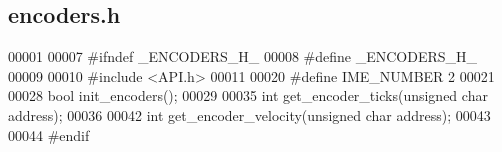 \subsection{encoders.\+h}
\label{encoders_8h_source}

\begin{DoxyCode}
00001 
00007 \textcolor{preprocessor}{#ifndef \_ENCODERS\_H\_}
00008 \textcolor{preprocessor}{#define \_ENCODERS\_H\_}
00009 
00010 \textcolor{preprocessor}{#include <API.h>}
00011 
00020 \textcolor{preprocessor}{#define IME\_NUMBER 2}
00021 
00028 \textcolor{keywordtype}{bool} init_encoders();
00029 
00035 \textcolor{keywordtype}{int} get_encoder_ticks(\textcolor{keywordtype}{unsigned} \textcolor{keywordtype}{char} address);
00036 
00042 \textcolor{keywordtype}{int} get_encoder_velocity(\textcolor{keywordtype}{unsigned} \textcolor{keywordtype}{char} address);
00043 
00044 \textcolor{preprocessor}{#endif}
\end{DoxyCode}
